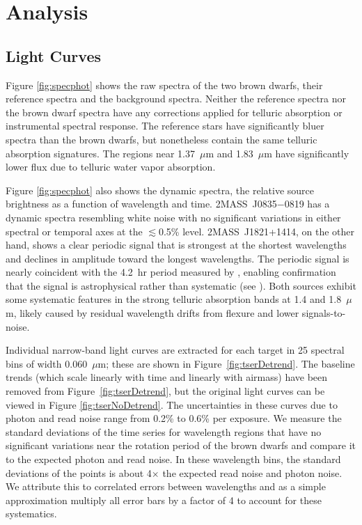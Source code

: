\documentclass[twocolumn]{aastex6}
\newcommand{\sha}{2MASS~J0835$-$0819}
\newcommand{\shb}{2MASS~J1821+1414}
\begin{document}
\section{Analysis}\label{sec:analysis}

\subsection{Light Curves}

Figure \ref{fig:specphot} shows the raw spectra of the two brown dwarfs, their reference spectra and the background spectra.
Neither the reference spectra nor the brown dwarf spectra have any corrections applied for telluric absorption or instrumental spectral response.
The reference stars have significantly bluer spectra than the brown dwarfs, but nonetheless contain the same telluric absorption signatures.
The regions near 1.37~$\mu$m and 1.83~$\mu$m have significantly lower flux due to telluric water vapor absorption.

Figure \ref{fig:specphot} also shows the dynamic spectra, the relative source brightness as a function of wavelength and time.
{\sha} has a dynamic spectra resembling white noise with no significant variations in either spectral or temporal axes at the $\lesssim$0.5\% level.
{\shb}, on the other hand, shows a clear periodic signal that is strongest at the shortest wavelengths and declines in amplitude toward the longest wavelengths. The periodic signal is nearly coincident with the 4.2~hr period measured by \citet{2015ApJ...799..154M}, enabling confirmation that the signal is astrophysical rather than systematic (see \citealt{2016ApJ...826..156S}).
Both sources exhibit some systematic features in the strong telluric absorption bands at 1.4 and 1.8~$\mu$m, likely caused by residual wavelength drifts from flexure and lower signals-to-noise.

Individual narrow-band light curves are extracted for each target in 25 spectral bins of width 0.060~$\mu$m; these are shown in Figure~\ref{fig:tserDetrend}.
The baseline trends (which scale linearly with time and linearly with airmass) have been removed from Figure~\ref{fig:tserDetrend}, but the original light curves can be viewed in Figure \ref{fig:tserNoDetrend}.
The uncertainties in these curves due to photon and read noise range from 0.2\% to 0.6\% per exposure.
We measure the standard deviations of the time series for wavelength regions that have no significant variations near the rotation period of the brown dwarfs and compare it to the expected photon and read noise.
In these wavelength bins, the standard deviations of the points is about 4$\times$ the expected read noise and photon noise.
We attribute this to correlated errors between wavelengths and as a simple approximation multiply all error bars by a factor of 4 to account for these systematics.
\end{document}
